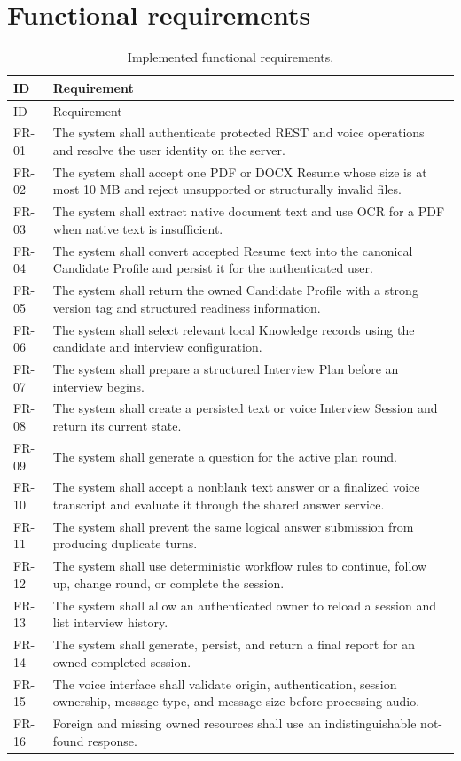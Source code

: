 \section{Functional requirements}

\begin{longtable}{p{}p{}}
\caption{Implemented functional requirements.}\label{tab:functional-requirements}\\
\toprule ID & Requirement\\ \midrule\endfirsthead
\toprule ID & Requirement\\ \midrule\endhead
FR-01 & The system shall authenticate protected REST and voice operations and resolve the user identity on the server.\\
FR-02 & The system shall accept one PDF or DOCX Resume whose size is at most 10 MB and reject unsupported or structurally invalid files.\\
FR-03 & The system shall extract native document text and use OCR for a PDF when native text is insufficient.\\
FR-04 & The system shall convert accepted Resume text into the canonical Candidate Profile and persist it for the authenticated user.\\
FR-05 & The system shall return the owned Candidate Profile with a strong version tag and structured readiness information.\\
FR-06 & The system shall select relevant local Knowledge records using the candidate and interview configuration.\\
FR-07 & The system shall prepare a structured Interview Plan before an interview begins.\\
FR-08 & The system shall create a persisted text or voice Interview Session and return its current state.\\
FR-09 & The system shall generate a question for the active plan round.\\
FR-10 & The system shall accept a nonblank text answer or a finalized voice transcript and evaluate it through the shared answer service.\\
FR-11 & The system shall prevent the same logical answer submission from producing duplicate turns.\\
FR-12 & The system shall use deterministic workflow rules to continue, follow up, change round, or complete the session.\\
FR-13 & The system shall allow an authenticated owner to reload a session and list interview history.\\
FR-14 & The system shall generate, persist, and return a final report for an owned completed session.\\
FR-15 & The voice interface shall validate origin, authentication, session ownership, message type, and message size before processing audio.\\
FR-16 & Foreign and missing owned resources shall use an indistinguishable not-found response.\\
\bottomrule
\end{longtable}

